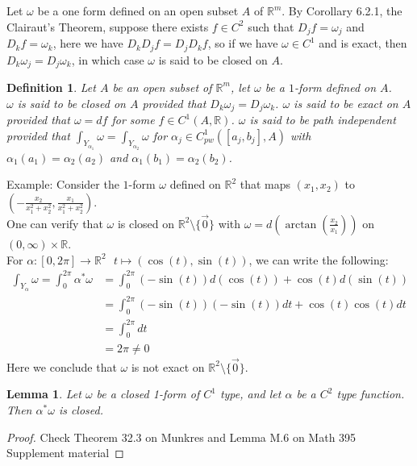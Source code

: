 \documentclass[11pt,oneside]{book}
\theoremstyle{break}
\theoremstyle{break}
\newtheorem{lem}{Lemma}[thm]
\newtheorem{defn}{Definition}[corL]
\newcommand{\R}{\mathbb{R}}
\newcommand{\example}{\color{green}Example: \color{black}}
\begin{document}
Let $\omega$ be a one form defined on an open subset $A$ of $\R^m$. By Corollary 6.2.1, the Clairaut's Theorem, suppose there exists $f \in C^2$ such that $D_jf = \omega_j$ and $D_kf = \omega_k$, here we have $D_kD_jf = D_jD_kf$, so if we have $\omega \in C^1$ and is exact, then $D_k\omega_j = D_j \omega_k$, in which case $\omega$ is said to be closed on $A$. 

\begin{defn}
Let $A$ be an open subset of $\R^m$, let $\omega$ be a $1$-form defined on $A$.\\
$\omega$ is said to be closed on $A$ provided that $D_k\omega_j = D_j \omega_k$. 
$\omega$ is said to be exact on $A$ provided that $\omega = df$ for some $f \in C^1(A,\R)$. $\omega$ is said to be path independent provided that $\int_{Y_{\alpha_1}} \omega = \int_{Y_{\alpha_2}}\omega$ for $\alpha_j \in C_{pw}^1([a_j,b_j],A)$ with $\alpha_1(a_1) = \alpha_2(a_2)$ and $\alpha_1(b_1) = \alpha_2(b_2)$. 
\end{defn}

\example Consider the $1$-form $\omega $ defined on $\R^2$ that maps $(x_1,x_2)$ to $(-\frac{x_2}{x_1^2+x_2^2} , \frac{x_1}{x_1^2+x_2^2})$.\\
One can verify that $\omega$ is closed on $\R^2 \setminus \{\vec{0}\}$ with $\omega = d(\arctan(\frac{x_2}{x_1}))$ on $(0,\infty) \times \R$.\\
For $\alpha:[0,2\pi] \to \R^2 \ \ \ t\mapsto (\cos(t),\sin(t))$, we can write the following:
\begin{align*}
\int_{Y_\alpha} \omega = \int_0^{2\pi} \alpha^*\omega &= \int_0^{2\pi} (-\sin(t))d(\cos(t)) + \cos(t) d(\sin(t)) \\&= \int_0^{2\pi} (-\sin(t))(-\sin(t))dt + \cos(t)\cos(t)dt \\&= \int_0^{2\pi} dt \\&= 2\pi \neq 0
\end{align*}
Here we conclude that $\omega$ is not exact on $\R^2 \setminus \{\vec{0}\}$. 

\begin{lem}
Let $\omega$ be a closed 1-form of $C^1$ type, and let $\alpha$ be a $C^2$ type function. Then $\alpha^*\omega$ is closed. 
\end{lem}
\begin{proof}
Check Theorem 32.3 on Munkres and Lemma M.6 on Math 395 Supplement material
\end{proof}
\end{document}
